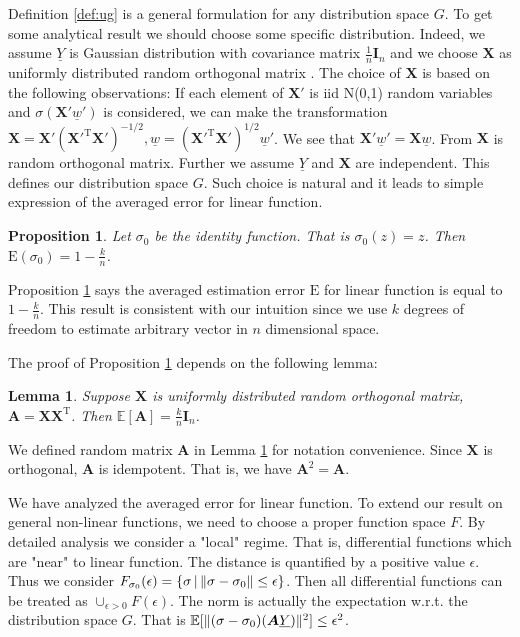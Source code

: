 \documentclass[conference]{IEEEtran}
\newtheorem{proposition}{Proposition}
\newtheorem{lemma}{Lemma}
\DeclarePairedDelimiter\norm{\lVert}{\rVert}
\def\E{\mathbb{E}}
\def\T{\mathrm{T}}
\begin{document}
Definition \ref{def:ug} is a general formulation for any distribution space $G$.
To get some analytical result we should choose some specific distribution.
Indeed, we assume $\underline{Y}$ is Gaussian distribution with covariance matrix $\frac{1}{n} \mathbf{I}_n$ and
we choose $\bm{X}$ as uniformly distributed random orthogonal matrix \cite{eaton1989group}. The choice of $\bm{X}$ is based on the following observations: If each element of $\bm{X}'$ is iid N(0,1) random variables and $\sigma(\bm{X}'\underline{w}')$ is considered, we can make the transformation $\bm{X} = \bm{X}'(\bm{X}'^\T\bm{X}')^{-1/2}, \underline{w} = (\bm{X}'^\T\bm{X}')^{1/2}\underline{w}'$. We see that $\bm{X}'\underline{w}' = \bm{X}\underline{w}$. From \cite[Proposition 7.1]{eaton1989group} $\bm{X}$ is random orthogonal matrix.
Further we assume $\underline{Y}$ and $\bm{X}$ are independent.
This defines our distribution space $G$. Such choice is natural and it leads to simple expression of the averaged error for linear function.

\begin{proposition}\label{prop:linear}
Let $\sigma_0$ be the identity function. That is $\sigma_0(z) = z$. Then $\mathrm{E}(\sigma_0) = 1 - \frac{k}{n}$.\end{proposition}

Proposition \ref{prop:linear} says the averaged estimation error $\mathrm{E}$ for linear function is equal to $1-\frac{k}{n}$.
This result is consistent with our intuition
since we use $k$ degrees of freedom to estimate arbitrary vector in $n$ dimensional space.

The proof of Proposition \ref{prop:linear} depends on the following lemma:
\begin{lemma}\label{lem:A}
Suppose $\bm{X}$ is uniformly distributed random orthogonal matrix, $\bm{A} = \bm{X}\bm{X}^\T$.
Then $\E[\bm{A}] = \frac{k}{n} \mathbf{I}_n$.
\end{lemma}
We defined random matrix $\bm{A}$ in Lemma \ref{lem:A} for notation convenience.
Since $\bm{X}$ is orthogonal, $\bm{A}$ is idempotent. That is, we have $\bm{A}^2 = \bm{A}$.

We have analyzed the averaged error for linear function. To extend our result on general non-linear functions, we need to choose a proper function space $F$. By detailed analysis we consider a "local" regime. That is, differential functions which are "near" to linear function. The distance is quantified by a positive value $\epsilon$. Thus we consider $F_{\sigma_0}(\epsilon) =\{ \sigma \,|\, \norm{\sigma - \sigma_0} \leq \epsilon\}$. Then all differential functions can be treated as $\cup_{\epsilon>0} F(\epsilon)$. The norm is actually the expectation w.r.t. the distribution space $G$. That is $\E[\norm{(\sigma - \sigma_0)(\bm{A}\underline{Y})}^2] \leq \epsilon^2$.
\end{document}
